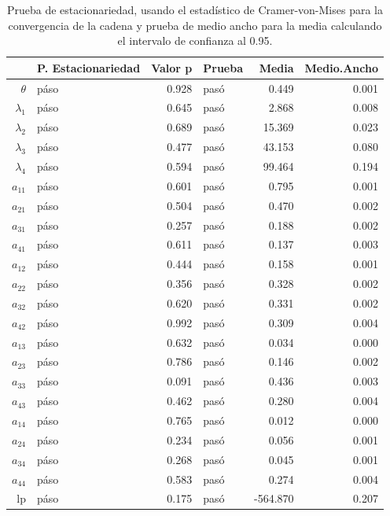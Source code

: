 \documentclass[a4paper]{article}\usepackage[]{graphicx}\usepackage[]{color}
\begin{document}
\begin{table}[ht]
\centering
\begin{tabular}{rlrlrr}
  \hline
 & P. Estacionariedad & Valor p & Prueba & Media & Medio.Ancho \\ 
  \hline
$\theta$ & páso & 0.928 & pasó & 0.449 & 0.001 \\ 
  $\lambda_1$ & páso & 0.645 & pasó & 2.868 & 0.008 \\ 
  $\lambda_2$ & páso & 0.689 & pasó & 15.369 & 0.023 \\ 
  $\lambda_3$ & páso & 0.477 & pasó & 43.153 & 0.080 \\ 
  $\lambda_4$ & páso & 0.594 & pasó & 99.464 & 0.194 \\ 
  $a_{11}$ & páso & 0.601 & pasó & 0.795 & 0.001 \\ 
  $a_{21}$ & páso & 0.504 & pasó & 0.470 & 0.002 \\ 
  $a_{31}$ & páso & 0.257 & pasó & 0.188 & 0.002 \\ 
  $a_{41}$ & páso & 0.611 & pasó & 0.137 & 0.003 \\ 
  $a_{12}$ & páso & 0.444 & pasó & 0.158 & 0.001 \\ 
  $a_{22}$ & páso & 0.356 & pasó & 0.328 & 0.002 \\ 
  $a_{32}$ & páso & 0.620 & pasó & 0.331 & 0.002 \\ 
  $a_{42}$ & páso & 0.992 & pasó & 0.309 & 0.004 \\ 
  $a_{13}$ & páso & 0.632 & pasó & 0.034 & 0.000 \\ 
  $a_{23}$ & páso & 0.786 & pasó & 0.146 & 0.002 \\ 
  $a_{33}$ & páso & 0.091 & pasó & 0.436 & 0.003 \\ 
  $a_{43}$ & páso & 0.462 & pasó & 0.280 & 0.004 \\ 
  $a_{14}$ & páso & 0.765 & pasó & 0.012 & 0.000 \\ 
  $a_{24}$ & páso & 0.234 & pasó & 0.056 & 0.001 \\ 
  $a_{34}$ & páso & 0.268 & pasó & 0.045 & 0.001 \\ 
  $a_{44}$ & páso & 0.583 & pasó & 0.274 & 0.004 \\ 
  lp & páso & 0.175 & pasó & -564.870 & 0.207 \\ 
   \hline
\end{tabular}
\caption{Prueba de estacionariedad, usando el estadístico de Cramer-von-Mises para la convergencia de la cadena y prueba de medio ancho para la media calculando el intervalo de confianza al 0.95.} 
\end{table}
\end{document}
